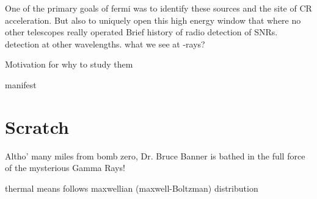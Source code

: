 One of the primary goals of fermi was to identify these sources and the site of CR acceleration. But also to uniquely open this high energy window that where no other telescopes really operated
Brief history of radio detection of SNRs. detection at other wavelengths. what we see at \g-rays?

Motivation for why to study them

manifest
\citep{Sturner95}
\citep{Esposito96}

\section{Scratch}

Altho' many miles from bomb zero, Dr. Bruce Banner is bathed in the full force of the mysterious Gamma Rays!

thermal means follows maxwellian (maxwell-Boltzman) distribution